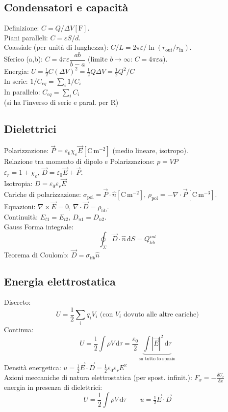 \documentclass{book}
\begin{document}
\subsection*{Condensatori e capacit\`a}
Definizione: $C=Q/\Delta V \left[ \mathrm{F} \right]$.\\
Piani paralleli: $C=\varepsilon S/d$.\\
Coassiale (per unit\`a di lunghezza): $C/L=2\pi\varepsilon/\ln(r_{\mathrm{out}}/r_{\mathrm{in}})$.\\
Sferico (a,b): $C=4\pi\varepsilon\dfrac{ab}{b-a}$ (limite $b\to\infty$: $C=4\pi\varepsilon a$).\\
Energia: $U=\tfrac{1}{2}C(\Delta V)^2=\tfrac{1}{2}Q\Delta V=\tfrac{1}{2}Q^2/C$\\
In serie: $1/C_{eq}= \sum_i 1/C_i$\\
In parallelo: $C_{eq}= \sum_i C_i$\\
(si ha l'inverso di serie e paral. per R)
\subsection*{Dielettrici}
Polarizzazione: $\vec{P}=\varepsilon_0\chi_e\vec{E} \left[ \mathrm{C\,m^{-2}} \right]$ (medio lineare, isotropo).\\
Relazione tra momento di dipolo e Polarizzazione:  $p=VP$\\
$\varepsilon_r=1+\chi_e$, \; $\vec{D}=\varepsilon_0\vec{E}+\vec{P}$.\\
Isotropia: $D=\varepsilon_0\varepsilon_r\vec{E}$\\
Cariche di polarizzazione: $\sigma_{\mathrm{pol}}=\vec{P}\cdot\hat{n} \left[ \mathrm{C\,m^{-2}} \right]$, \; $\rho_{\mathrm{pol}}=-\nabla\cdot\vec{P} \left[ \mathrm{C\,m^{-3}} \right]$.\\
Equazioni: $\nabla\times\vec{E}=0$, \; $\nabla\cdot\vec{D}=\rho_{\mathrm{lib}}$.\\
Continuit\`a: $E_{t1}=E_{t2}$, \; $D_{n1}=D_{n2}$.\\
Gauss Forma integrale:
\[
\oint_{\Sigma}\vec{D}\cdot\hat{n}\,\mathrm{d}S=Q_{lib}^{int}
\]
Teorema di Coulomb: 
$\vec{D}= \sigma_{lib} \hat{n}$

\subsection*{Energia elettrostatica}
Discreto: 
\[
U=\dfrac{1}{2}\sum_i q_i V_i \text{ (con $V_i$ dovuto alle altre cariche)}
\]
Continua: 
\[
U=\dfrac{1}{2}\int \rho V\,\mathrm{d}\tau = \dfrac{\varepsilon_0}{2}\underbrace{\int |\vec{E}|^2\,\mathrm{d}\tau}_{\text{su tutto lo spazio}}
\] 
Densit\`a energetica: $u=\tfrac{1}{2}\vec{E}\cdot\vec{D}=\tfrac{1}{2}\varepsilon_0\varepsilon_r E^2$\\
Azioni meccaniche di natura elettrostatica (per spost. infinit.): $F_x = -\frac{\delta U_e}{\delta x}$\\
energia in presenza di dielettrici:
$$
U=\dfrac{1}{2}\int \rho V\,\mathrm{d}\tau \qquad u=\tfrac{1}{2}\vec{E}\cdot\vec{D}
$$
\end{document}
